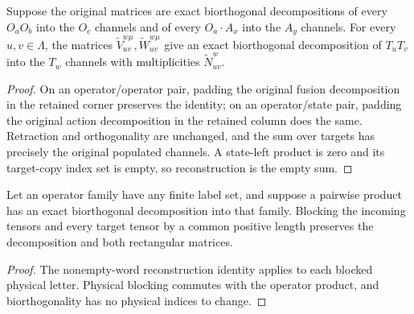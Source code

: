 \begin{lemma}
    \leanok
    \label{thm:glm_triangular_boundary_exact}
    Suppose the original matrices are exact biorthogonal decompositions
    of every $O_aO_b$ into the $O_c$ channels and of every $O_a\cdot A_x$
    into the $A_y$ channels. For every $u,v\in\Lambda$, the matrices
    $\widetilde V_{uv}^{w\mu},\widetilde W_{uv}^{w\mu}$ give an exact
    biorthogonal decomposition of $T_uT_v$ into the $T_w$ channels with
    multiplicities $\widetilde N_{uv}^w$.
\end{lemma}
\begin{proof}
    \leanok
    On an operator/operator pair, padding the original fusion decomposition
    in the retained corner preserves the identity; on an operator/state pair,
    padding the original action decomposition in the retained column does the
    same. Retraction and orthogonality are unchanged, and the sum over targets
    has precisely the original populated channels. A state-left product is
    zero and its target-copy index set is empty, so reconstruction is the
    empty sum.
\end{proof}

\begin{lemma}
    \leanok
    \label{thm:glm_triangular_boundary_blocking}
    Let an operator family have any finite label set, and suppose a
    pairwise product has an exact biorthogonal decomposition into that
    family. Blocking the incoming tensors and every target tensor by a
    common positive length preserves the decomposition and both
    rectangular matrices.
\end{lemma}
\begin{proof}
    \leanok
    The nonempty-word reconstruction identity applies to each blocked
    physical letter. Physical blocking commutes with the operator
    product, and biorthogonality has no physical indices to change.
\end{proof}

